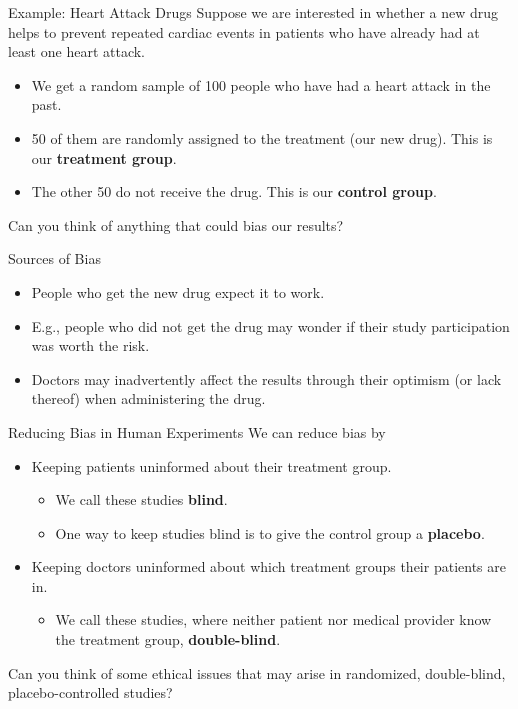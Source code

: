 \begin{frame}{Example: Heart Attack Drugs}
    Suppose we are interested in whether a new drug helps to prevent repeated cardiac events in patients who have already had at least one heart attack. 
    
    \begin{itemize}
        \item We get a random sample of 100 people who have had a heart attack in the past. 
        \item 50 of them are randomly assigned to the treatment (our new drug). This is our \textbf{treatment group}.
        \item The other 50 do not receive the drug. This is our \textbf{control group}. 
    \end{itemize}
    
    Can you think of anything that could bias our results?
\end{frame}

\begin{frame}{Sources of Bias}
    \begin{itemize}
        \item People who get the new drug expect it to work.
        \item E.g., people who did not get the drug may wonder if their study participation was worth the risk.
        \item Doctors may inadvertently affect the results through their optimism (or lack thereof) when administering the drug. 
    \end{itemize}
\end{frame}

\begin{frame}{Reducing Bias in Human Experiments}
    We can reduce bias by 
    \begin{itemize}
        \item Keeping patients uninformed about their treatment group.
        \begin{itemize}
            \item We call these studies \textbf{blind}.
            \item One way to keep studies blind is to give the control group a \textbf{placebo}.
        \end{itemize}
        \item Keeping doctors uninformed about which treatment groups their patients are in.
        \begin{itemize}
            \item We call these studies, where neither patient nor medical provider know the treatment group, \textbf{double-blind}. 
        \end{itemize}
    \end{itemize}
    
    \vspace{12pt}
    Can you think of some ethical issues that may arise in randomized, double-blind, placebo-controlled studies?
\end{frame}